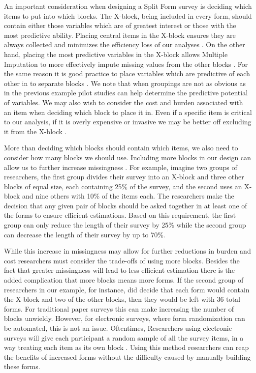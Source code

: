 \documentclass{svjour3}                     %
\begin{document}
An important consideration when designing a Split Form survey is deciding which items to put into which blocks. The X-block, being included in every form, should contain either those variables which are of greatest interest or those with the most predictive ability.
Placing central items in the X-block ensures they are always collected and minimizes the efficiency loss of our analyses \citep{thomas2006evaluation}. On the other hand, placing the most predictive variables in the X-block allows Multiple Imputation to more effectively impute missing values from the other blocks \citep{gottschall2012comparison}. For the same reason it is good practice to place variables which are predictive of each other in to separate blocks \citep{gottschall2012comparison}. We note that when groupings are not as obvious as in the previous example pilot studies can help determine the predictive potential of variables. We may also wish to consider the cost and burden associated with an item when deciding which block to place it in. Even if a specific item is critical to our analysis, if it is overly expensive or invasive we may be better off excluding it from the X-block \citep{little2013planned}. \par


More than deciding which blocks should contain which items, we also need to consider how many blocks we should use. Including more blocks in our design can allow us to further increase missingness \citep{graham2006planned}. For example, imagine two groups of researchers, the first group divides their survey into an X-block and three other blocks of equal size, each containing 25\% of the survey, and the second uses an X-block and nine others with 10\% of the items each. The researchers make the decision that any given pair of blocks should be asked together in at least one of the forms to ensure efficient estimations. Based on this requirement, the first group can only reduce the length of their survey by 25\% while the second group can decrease the length of their survey by up to 70\%. \par

While this increase in missingness may allow for further reductions in burden and cost researchers must consider the trade-offs of using more blocks. Besides the fact that greater missingness will lead to less efficient estimation \citep{rhemtulla2016asymptotic} there is the added complication that more blocks means more forms. If the second group of researchers in our example, for instance, did decide that each form would contain the X-block and two of the other blocks, then they would be left with 36 total forms. For traditional paper surveys this can make increasing the number of blocks unwieldy. However, for electronic surveys, where form randomization can be automated, this is not an issue. Oftentimes, Researchers using electronic surveys will give each participant a random sample of all the survey items, in a way treating each item as its own block \citep{silvia2014planned}. Using this method researchers can reap the benefits of increased forms without the difficulty caused by manually building these forms. \par
\end{document}
